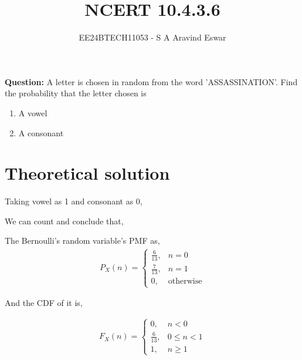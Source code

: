 \documentclass[journal]{IEEEtran}
\begin{document}

\vspace{3cm}

\title{NCERT 10.4.3.6}
\author{EE24BTECH11053 - S A Aravind Eswar}
{\let\newpage\relax\maketitle}

\renewcommand{\thefigure}{\theenumi}
\renewcommand{\thetable}{\theenumi}
\setlength{\intextsep}{10pt} %

\textbf{Question:} A letter is chosen in random from the word 'ASSASSINATION'. Find the probability that the letter chosen is
\begin{enumerate}
    \item A vowel
    \item A consonant
\end{enumerate}

\section{Theoretical solution}
    Taking vowel as 1 and consonant as 0,

    We can count and conclude that,

    The Bernoulli's random variable's PMF as,
    \begin{align}
        P_X(n) = \begin{cases}
            \frac{6}{13},& n=0\\
            \frac{7}{13},& n=1\\
            0,& \text{otherwise}
        \end{cases}
    \end{align}

    And the CDF of it is,

    \begin{align}
        F_X(n) = \begin{cases}
            0,& n<0\\
            \frac{6}{13},& 0\leq n<1\\
            1,&n\geq1
        \end{cases}
    \end{align}
\end{document}
